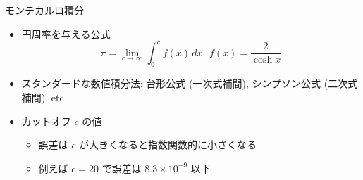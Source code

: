 \begin{frame}[t,fragile]{モンテカルロ積分}
  \begin{itemize}
    \setlength{\itemsep}{1em}
  \item 円周率を与える公式
    \[
    \pi = \lim_{c \rightarrow \infty} \int_0^c f(x) \, dx \ \ \ f(x) = \frac{2}{\cosh x}
    \]
  \item スタンダードな数値積分法: 台形公式 (一次式補間), シンプソン公式 (二次式補間), etc
  \item カットオフ $c$ の値
    \begin{itemize}
    \item 誤差は $c$ が大きくなると指数関数的に小さくなる
    \item 例えば $c = 20$ で誤差は $8.3 \times 10^{-9}$ 以下
    \end{itemize}
  \end{itemize}
\end{frame}

